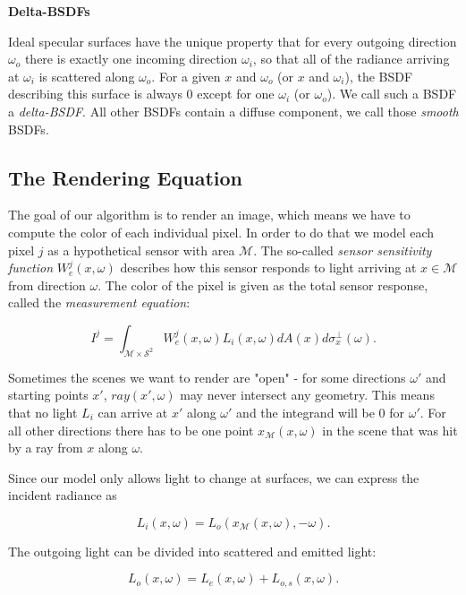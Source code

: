 \textbf{Delta-BSDFs}

Ideal specular surfaces have the unique property that for every outgoing direction $\omega_o$ there is exactly one incoming direction $\omega_i$, so that all of the radiance arriving at $\omega_i$ is scattered along $\omega_o$. For a given $x$ and $\omega_o$ (or $x$ and $\omega_i$), the BSDF describing this surface is always $0$ except for one $\omega_i$ (or $\omega_o$). We call such a BSDF a \emph{delta-BSDF}. All other BSDFs contain a diffuse component, we call those \emph{smooth} BSDFs.


\newpage
\subsection{The Rendering Equation}

The goal of our algorithm is to render an image, which means we have to compute the color of each individual pixel. In order to do that we model each pixel $j$ as a hypothetical sensor with area $\mathcal{M}$. The so-called \emph{sensor sensitivity function} $W_e^j(x,\omega)$ describes how this sensor responds to light arriving at $x\in \mathcal{M}$ from direction $\omega$. The color of the pixel is given as the total sensor response, called the \emph{measurement equation}:

\begin{equation}
\label{measurement equation}
I^j = \int_{\mathcal{M}\times\mathcal{S}^2}W^j_e(x,\omega)L_i(x,\omega)dA(x)d\sigma^\bot_x(\omega).
\end{equation}

Sometimes the scenes we want to render are "open" - for some directions $\omega'$ and starting points $x'$, $ray(x',\omega)$ may never intersect any geometry. This means that no light $L_i$ can arrive at $x'$ along $\omega'$ and the integrand will be $0$ for $\omega'$. For all other directions there has to be one point $x_\mathcal{M}(x,\omega)$ in the scene that was hit by a ray from $x$ along $\omega$.

Since our model only allows light to change at surfaces, we can express the incident radiance as

\begin{equation*}
L_i(x,\omega) = L_o(x_\mathcal{M}(x,\omega),-\omega).
\end{equation*}

The outgoing light can be divided into scattered and emitted light:

\begin{equation*}
L_o(x,\omega) = L_e(x,\omega) + L_{o,s}(x,\omega).
\end{equation*}

